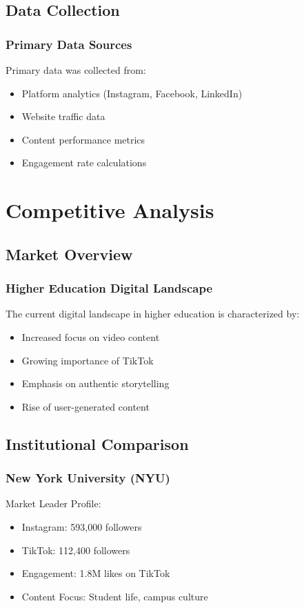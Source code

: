 \documentclass[12pt]{report}
\begin{document}
\section{Data Collection}
\subsection{Primary Data Sources}
Primary data was collected from:
\begin{itemize}
    \item Platform analytics (Instagram, Facebook, LinkedIn)
    \item Website traffic data
    \item Content performance metrics
    \item Engagement rate calculations
\end{itemize}

\chapter{Competitive Analysis}

\section{Market Overview}
\subsection{Higher Education Digital Landscape}
The current digital landscape in higher education is characterized by:
\begin{itemize}
    \item Increased focus on video content
    \item Growing importance of TikTok
    \item Emphasis on authentic storytelling
    \item Rise of user-generated content
\end{itemize}

\section{Institutional Comparison}
\subsection{New York University (NYU)}
Market Leader Profile:
\begin{itemize}
    \item Instagram: 593,000 followers
    \item TikTok: 112,400 followers
    \item Engagement: 1.8M likes on TikTok
    \item Content Focus: Student life, campus culture
\end{itemize}
\end{document}

